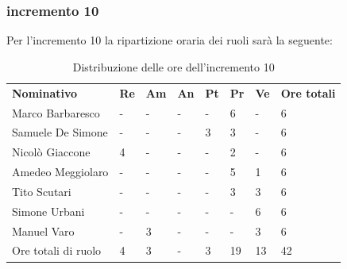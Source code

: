 \subsubsection{incremento 10}
Per l'incremento 10 la ripartizione oraria dei ruoli sarà la seguente:
\begin{center}
    \begin{table}[ht!]
        \centering
        \caption{Distribuzione delle ore dell'incremento 10}
        \vspace{5px}
        \renewcommand{\arraystretch}{1.8}
        \begin{tabular}{p{100px} p{20px} p{20px} p{20px} p{20px} p{20px} p{20px} p{50px} }
            \rowcolor{logo!70} \textbf{Nominativo} & \textbf{Re} & \textbf{Am} & \textbf{An} & \textbf{Pt} & \textbf{Pr} & \textbf{Ve} & \textbf{Ore totali} \\
            Marco Barbaresco                       & -           & -           & -           & -           & 6           & -           & 6                   \\
            Samuele De Simone                      & -           & -           & -           & 3           & 3           & -           & 6                   \\
            Nicolò Giaccone                        & 4           & -           & -           & -           & 2           & -           & 6                   \\
            Amedeo Meggiolaro                      & -           & -           & -           & -           & 5           & 1           & 6                   \\
            Tito Scutari                           & -           & -           & -           & -           & 3           & 3           & 6                   \\
            Simone Urbani                          & -           & -           & -           & -           & -           & 6           & 6                   \\
            Manuel Varo                            & -           & 3           & -           & -           & -           & 3           & 6                   \\
            Ore totali di ruolo                    & 4           & 3           & -           & 3           & 19          & 13          & 42                  \\
        \end{tabular}
    \end{table}
\end{center}
